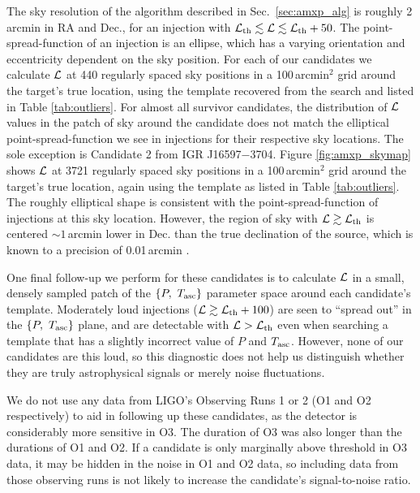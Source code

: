 \begin{subappendices}
The sky resolution of the algorithm described in Sec.~\ref{sec:amxp_alg} is roughly 2\, arcmin in RA and Dec., for an injection with $\mathcal{L}_{\rm th} \lesssim \mathcal{L} \lesssim \mathcal{L}_{\rm th} + 50$. The point-spread-function of an injection is an ellipse, which has a varying orientation and eccentricity dependent on the sky position. For each of our candidates we calculate $\mathcal{L}$ at 440 regularly spaced sky positions in a 100\,arcmin$^2$ grid around the target's true location, using the template recovered from the search and listed in Table \ref{tab:outliers}. For almost all survivor candidates, the distribution of $\mathcal{L}$ values in the patch of sky around the candidate does not match the elliptical point-spread-function we see in injections for their respective sky locations. The sole exception is Candidate 2 from IGR J16597$-$3704. Figure \ref{fig:amxp_skymap} shows $\mathcal{L}$ at 3721 regularly spaced sky positions in a 100\,arcmin$^2$ grid around the target's true location, again using the template as listed in Table \ref{tab:outliers}. The roughly elliptical shape is consistent with the point-spread-function of injections at this sky location. However, the region of sky with $\mathcal{L} \gtrsim \mathcal{L}_{\rm th}$ is centered $\sim 1\,$arcmin lower in Dec. than the true declination of the source, which is known to a precision of 0.01\,arcmin \cite{Tetarenko2018}. 

One final follow-up we perform for these candidates is to calculate $\mathcal{L}$ in a small, densely sampled patch of the $\{P,\ T_{\textrm{asc}}\}$ parameter space around each candidate's template. Moderately loud injections ($\mathcal{L} \gtrsim \mathcal{L}_{\rm th} + 100$) are seen to ``spread out'' in the $\{P,\ T_{\textrm{asc}}\}$ plane, and are detectable with $\mathcal{L} > \mathcal{L}_{\rm th}$ even when searching a template that has a slightly incorrect value of $P$ and $T_{\textrm{asc}}$. However, none of our candidates are this loud, so this diagnostic does not help us distinguish whether they are truly astrophysical signals or merely noise fluctuations.

We do not use any data from LIGO's Observing Runs 1 or 2 (O1 and O2 respectively) to aid in following up these candidates, as the detector is considerably more sensitive in O3. The duration of O3 was also longer than the durations of O1 and O2. If a candidate is only marginally above threshold in O3 data, it may be hidden in the noise in O1 and O2 data, so including data from those observing runs is not likely to increase the candidate's signal-to-noise ratio. 


\end{subappendices}

